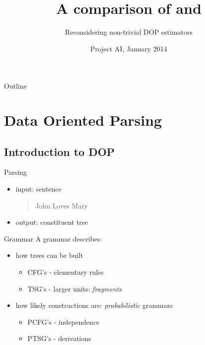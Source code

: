 \documentclass{beamer}
\title{ A comparison of \ddop{} and \dops{}}
\subtitle{Reconsidering non-trivial DOP estimators}
\author[Kruit, Veldhoen]{Benno Kruit\and Sara Veldhoen{\\\vspace{.6cm}\small Supervised by: \\Andreas van Cranenburg \and Khalil Sima'an}}
\institute{University of Amsterdam (UvA)}
\date{Project AI, January 2014}
\begin{document}
\begin{frame}
  \titlepage
\end{frame}

\begin{frame}{Outline}
  \tableofcontents   %
\end{frame}

\section{Data Oriented Parsing}

\subsection{Introduction to DOP}

\begin{frame}{Parsing}%

  \begin{itemize}
  \item input: sentence 
\begin{quotation} John Loves Mary \end{quotation}
\pause
  \item output: constituent tree
\begin{figure}

\end{figure}
  \end{itemize}
\end{frame}

\begin{frame}{Grammar}
A grammar describes:
\begin{itemize}
\item how trees can be built
\begin{itemize} 
\item CFG's - elementary rules
\item TSG's  - larger units: \emph{fragments}
\end{itemize}
\item how likely constructions are: \emph{probabilistic} grammars
\begin{itemize} 
\item PCFG's - independence 
\item PTSG's  - derivations
\end{itemize}

\end{itemize}
\end{frame}
\end{document}
